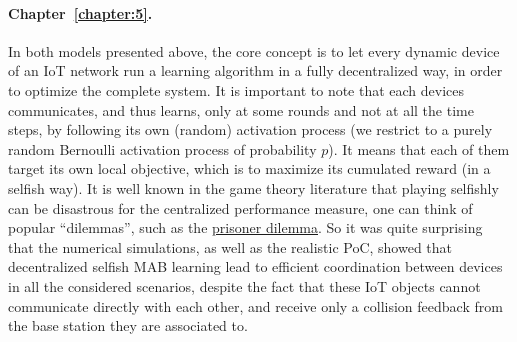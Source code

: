 \paragraph{Chapter~\ref{chapter:5}.}
%
In both models presented above, the core concept is to let every dynamic device of an IoT network run a learning algorithm in a fully decentralized way, in order to optimize the complete system.
It is important to note that each devices communicates, and thus learns, only at some rounds and not at all the time steps, by following its own (random) activation process (we restrict to a purely random Bernoulli activation process of probability $p$).
It means that each of them target its own local objective, which is to maximize its cumulated reward (in a selfish way).
It is well known in the game theory literature that playing selfishly can be disastrous for the centralized performance measure, one can think of popular ``dilemmas'', such as the \href{https://en.wikipedia.org/wiki/Prisoner%27s_dilemma}{prisoner dilemma}.
So it was quite surprising that the numerical simulations, as well as the realistic PoC, showed that decentralized selfish MAB learning lead to efficient coordination between devices in all the considered scenarios, despite the fact that these IoT objects cannot communicate directly with each other, and receive only a collision feedback from the base station they are associated to.

